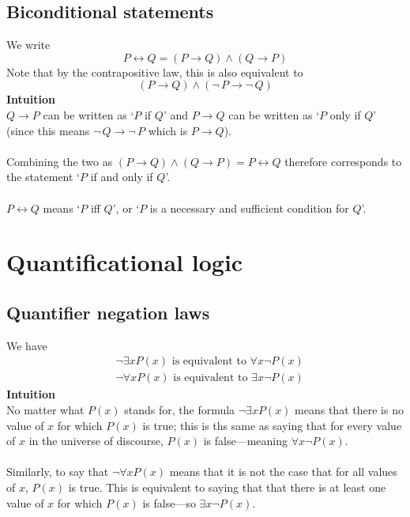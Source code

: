 \documentclass{report}
\begin{document}
\subsection{Biconditional statements}
We write
\begin{equation*}
P\leftrightarrow Q=(P\to Q)\land(Q\to P)
\end{equation*}
Note that by the contrapositive law, this is also equivalent to
\begin{equation*}
(P\to Q)\land(\neg\,P\to\neg\,Q)
\end{equation*}
\textbf{Intuition}\\
$Q\to P$ can be written as `$P$ if $Q$' and $P\to Q$ can be written as `$P$ only if $Q$' (since this means $\neg\,Q\to\neg\,P$ which is $P\to Q$).\\
\vspace{1mm}\\
Combining the two as $(P\to Q)\land(Q\to P)=P\leftrightarrow Q$ therefore corresponds to the statement 
`$P$ if and only if $Q$'.\\
\vspace{1mm}\\
$P\leftrightarrow Q$ means `$P$ iff $Q$', or `$P$ is a necessary and sufficient condition for $Q$'.
\newpage

\section{Quantificational logic}
\subsection{Quantifier negation laws}
We have
\begin{align*}
&\neg\exists xP(x)\text{ is equivalent to }\forall x\neg P(x)\\
&\neg\forall xP(x)\text{ is equivalent to }\exists x\neg P(x)
\end{align*}
\textbf{Intuition}\\
No matter what $P(x)$ stands for, the formula $\neg\exists xP(x)$ means that there is no value of $x$ for which $P(x)$ is true; this is ths same as saying that for every value of $x$ in 
the universe of discourse, $P(x)$ is false---meaning $\forall x\neg P(x)$.\\
\vspace{1mm}\\
Similarly, to say that $\neg\forall xP(x)$ means that it is not the case that for all values of $x$, $P(x)$ is true. This is equivalent to saying that that there is at least one
value of $x$ for which $P(x)$ is false---so $\exists x\neg P(x)$.
\end{document}
